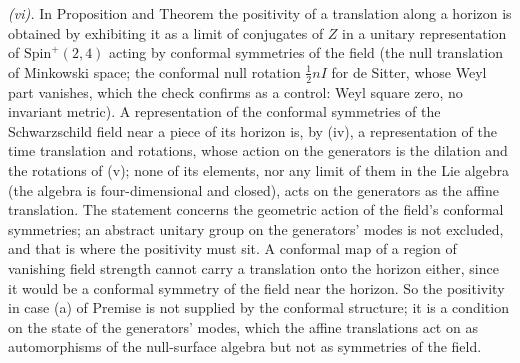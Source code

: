 \emph{(vi).} In Proposition  and Theorem  the positivity of a translation along a horizon is obtained by exhibiting it as a limit of conjugates of $Z$ in a unitary representation of $\mathrm{Spin}^{+}(2,4)$ acting by conformal symmetries of the field (the null translation of Minkowski space; the conformal null rotation $\tfrac12 nI$ for de Sitter, whose Weyl part vanishes, which the check confirms as a control: Weyl square zero, no invariant metric). A representation of the conformal symmetries of the Schwarzschild field near a piece of its horizon is, by (iv), a representation of the time translation and rotations, whose action on the generators is the dilation and the rotations of (v); none of its elements, nor any limit of them in the Lie algebra (the algebra is four-dimensional and closed), acts on the generators as the affine translation. The statement concerns the geometric action of the field's conformal symmetries; an abstract unitary group on the generators' modes is not excluded, and that is where the positivity must sit. A conformal map of a region of vanishing field strength cannot carry a translation onto the horizon either, since it would be a conformal symmetry of the field near the horizon. So the positivity in case (a) of Premise  is not supplied by the conformal structure; it is a condition on the state of the generators' modes, which the affine translations act on as automorphisms of the null-surface algebra but not as symmetries of the field.
